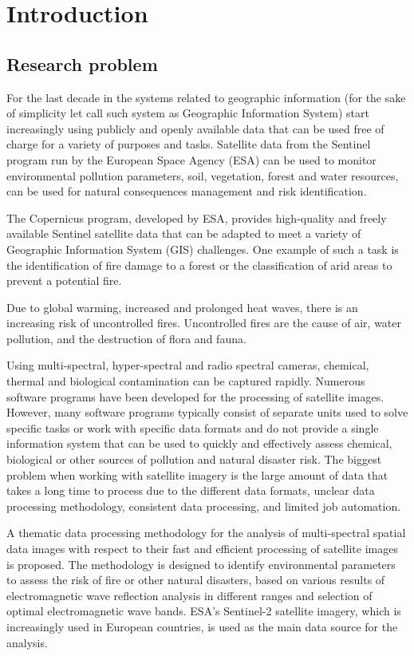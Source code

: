 \chapter{Introduction}
\label{cha:intro}

\section{Research problem}

	For the last decade in the systems related to geographic information (for the sake of simplicity let call such system as Geographic Information System) start increasingly using publicly and openly available data that can be used free of charge for a variety of purposes and tasks. Satellite data from the Sentinel program run by the European Space Agency (ESA) can be used to monitor environmental pollution parameters, soil, vegetation, forest and water resources, can be used for natural consequences management and risk identification.
	
	The Copernicus program, developed by ESA, provides high-quality and freely available Sentinel satellite data that can be adapted to meet a variety of Geographic Information System (GIS) challenges. One example of such a task is the identification of fire damage to a forest or the classification of arid areas to prevent a potential fire.
	
	Due to global warming, increased and prolonged heat waves, there is an increasing risk of uncontrolled fires. Uncontrolled fires are the cause of air, water pollution, and the destruction of flora and fauna.
	
	Using multi-spectral, hyper-spectral and radio spectral cameras, chemical, thermal and biological contamination can be captured rapidly. Numerous software programs have been developed for the processing of satellite images. However, many software programs typically consist of separate units used to solve specific tasks or work with specific data formats and do not provide a single information system that can be used to quickly and effectively assess chemical, biological or other sources of pollution and natural disaster risk. The biggest problem when working with satellite imagery is the large amount of data that takes a long time to process due to the different data formats, unclear data processing methodology, consistent data processing, and limited job automation.
	
	A thematic data processing methodology for the analysis of multi-spectral spatial data images with respect to their fast and efficient processing of satellite images is proposed. The methodology is designed to identify environmental parameters to assess the risk of fire or other natural disasters, based on various results of electromagnetic wave reflection analysis in different ranges and selection of optimal electromagnetic wave bands. ESA's Sentinel-2 satellite imagery, which is increasingly used in European countries, is used as the main data source for the analysis.

